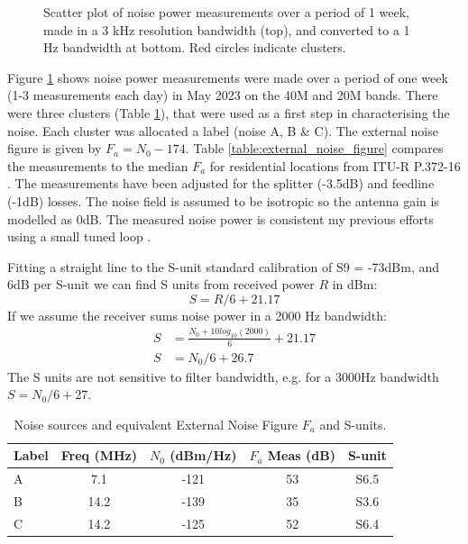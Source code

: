 \documentclass{article}
\begin{document}
\begin{figure}[h]
\caption{Scatter plot of noise power measurements over a period of 1 week, made in a 3 kHz resolution bandwidth (top), and converted to a 1 Hz bandwidth at bottom.  Red circles indicate clusters.}
\label{fig:noise_measurements}
\begin{center}

\end{center}
\end{figure}

Figure \ref{fig:noise_measurements} shows noise power measurements were made over a period of one week (1-3 measurements each day) in May 2023 on the 40M and 20M bands.  There were three clusters (Table \ref{table:measurement_clusters}), that were used as a first step in characterising the noise. Each cluster was allocated a label (noise A, B \& C). The external noise figure is given by $F_a = N_0 - 174$. Table \ref{table:external_noise_figure} compares the measurements to the median $F_a$ for residential locations from ITU-R P.372-16 \cite{itu372-16}. The measurements have been adjusted for the splitter (-3.5dB) and feedline (-1dB) losses.  The noise field is assumed to be isotropic so the antenna gain is modelled as 0dB. The measured noise power is consistent my previous efforts using a small tuned loop \cite{rowetel_noise_city}.

Fitting a straight line to the S-unit standard calibration of S9 = -73dBm, and 6dB per S-unit we can find S units from received power $R$ in dBm:
\begin{equation}
S = R/6 + 21.17
\end{equation}
If we assume the receiver sums noise power in a 2000 Hz bandwidth:
\begin{equation} \label{eq:s_unit}
\begin{split}
S &= \frac{N_0+10log_{10}(2000)}{6} + 21.17 \\
S &= N_0/6 + 26.7
\end{split}
\end{equation}
The S units are not sensitive to filter bandwidth, e.g. for a 3000Hz bandwidth $S = N_0/6 + 27$.
\begin{table}[h]
\centering
\begin{tabular}{l c c c c}
 \hline
 Label & Freq (MHz) & $N_0$ (dBm/Hz) & $F_a$ Meas (dB) & S-unit \\
 \hline
 A & 7.1  & -121 & 53 & S6.5 \\
 B & 14.2 & -139 & 35 & S3.6 \\
 C & 14.2 & -125 & 52 & S6.4 \\
\end{tabular}
\caption{Noise sources and equivalent External Noise Figure $F_a$ and S-units.}
\label{table:measurement_clusters}
\end{table}
\end{document}
